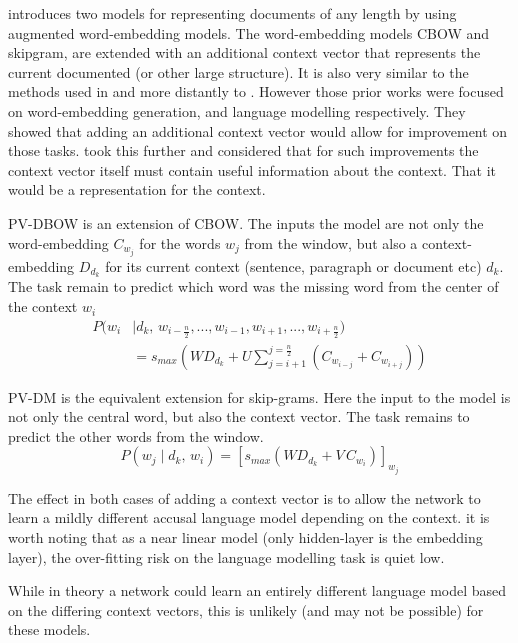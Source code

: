 \documentclass[12pt,parskip]{komatufte}
\begin{document}
 introduces two models for representing documents of any length by using augmented word-embedding models.
The word-embedding models CBOW and skipgram, are extended with an additional context vector that represents the current documented (or other large structure).
It is also very similar to the methods used in  and more distantly to .
However those prior works were focused on word-embedding generation, and language modelling respectively.
They showed that adding an additional context vector would allow for improvement on those tasks.
\textcite{le2014distributed} took this further and considered that for such improvements the context vector itself must contain useful information about the context.
That it would be a representation for the context.


PV-DBOW is an extension of CBOW.
The inputs the model are not only the word-embedding $C_{w_j}$ for the words $w_j$ from the window,
but also a context-embedding $D_{d_k}$ for its current context (sentence, paragraph or document etc) $d_k$.
The task remain to predict which word was the missing word from the center of the context $w_i$
\begin{align}
P(w_i & \mid d_k,\, w_{i-\frac{n}{2}},..., w_{i-1}, w_{i+1},...,w_{i+\frac{n}{2}})  \nonumber
\\  & = s_{max}(WD_{d_k} + U \sum_{j=i+1}^{j=\frac{n}{2}} \left( C_{w_{i-j}}+C_{w_{i+j}} \right))
\end{align}



PV-DM is the equivalent extension for skip-grams.
Here the input to the model is not only the central word, but also the context vector.
The task remains to predict the other words from the window.
\begin{equation}
P(w_j \mid d_k,\, w_{i}) = \left[ s_{max}(WD_{d_k} + V\,C_{w_{i}}) \right]_{w_j} 
\end{equation}

The effect in both cases of adding a context vector is to allow the network to learn a mildly different accusal language model depending on the context.
it is worth noting that as a near linear model (only hidden-layer is the embedding layer), the over-fitting risk on the language modelling task is quiet low.

While in theory a network could learn an entirely different language model based on the differing context vectors,
this is unlikely (and may not be possible) for these models. 
\end{document}
